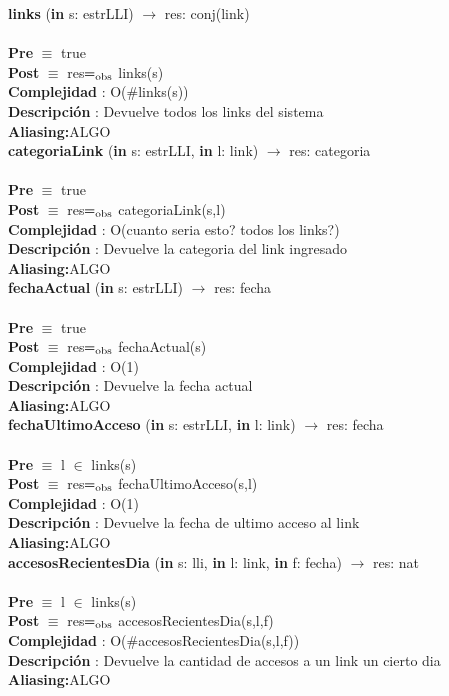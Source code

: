 \documentclass[10pt, a4paper]{article}
\begin{document}
	\textbf{links} (\textbf{in} s: estrLLI) $\longrightarrow$ res: conj(link)\\\\
	\textbf{Pre} $\equiv$ {true}\\
	\textbf{Post} $\equiv$ {res$=_{\mathrm{obs}}$ links(s)}\\
	\textbf{Complejidad} : O($\#$links(s))\\
	\textbf{Descripci\'{o}n} : Devuelve todos los links del sistema\\
	\textbf{Aliasing:}ALGO \\
	
	\textbf{categoriaLink} (\textbf{in} s: estrLLI, \textbf{in} l: link) $\longrightarrow$ res: categoria\\\\
	\textbf{Pre} $\equiv$ {true}\\
	\textbf{Post} $\equiv$ {res$=_{\mathrm{obs}}$ categoriaLink(s,l)}\\
	\textbf{Complejidad} : O(cuanto seria esto? todos los links?)\\
	\textbf{Descripci\'{o}n} : Devuelve la categoria del link ingresado\\
	\textbf{Aliasing:}ALGO \\

	\textbf{fechaActual} (\textbf{in} s: estrLLI) $\longrightarrow$ res: fecha\\\\
	\textbf{Pre} $\equiv$ {true}\\
	\textbf{Post} $\equiv$ {res$=_{\mathrm{obs}}$ fechaActual(s)}\\
	\textbf{Complejidad} : O(1)\\
	\textbf{Descripci\'{o}n} : Devuelve la fecha actual\\
	\textbf{Aliasing:}ALGO \\
	
	\textbf{fechaUltimoAcceso} (\textbf{in} s: estrLLI, \textbf{in} l: link) $\longrightarrow$ res: fecha\\\\
	\textbf{Pre} $\equiv$ {l $\in$ links(s)}\\
	\textbf{Post} $\equiv$ {res$=_{\mathrm{obs}}$ fechaUltimoAcceso(s,l)}\\
	\textbf{Complejidad} : O(1)\\
	\textbf{Descripci\'{o}n} : Devuelve la fecha de ultimo acceso al link\\
	\textbf{Aliasing:}ALGO \\
	
	\textbf{accesosRecientesDia} (\textbf{in} s: lli, \textbf{in} l: link, \textbf{in} f: fecha) $\longrightarrow$ res: nat\\\\
	\textbf{Pre} $\equiv$ {l $\in$ links(s)}\\
	\textbf{Post} $\equiv$ {res$=_{\mathrm{obs}}$ accesosRecientesDia(s,l,f)}\\
	\textbf{Complejidad} : O($\#$accesosRecientesDia(s,l,f))\\
	\textbf{Descripci\'{o}n} : Devuelve la cantidad de accesos a un link un cierto dia\\
	\textbf{Aliasing:}ALGO \\
	
\end{document}
